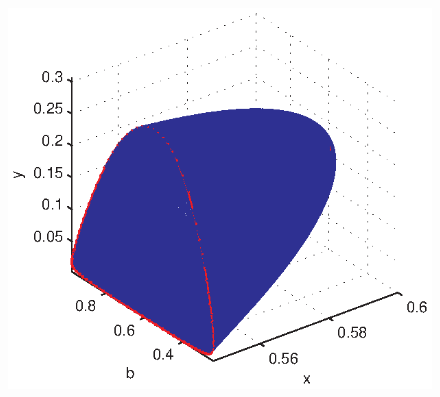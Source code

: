 \begin{figure}[htp]
\centering
\includegraphics{img/ex3/3dlimitcycles.eps}
\caption{}
\label{fig:}
\end{figure}


